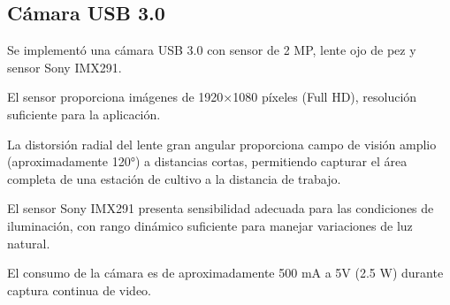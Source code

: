 \subsection{Cámara USB 3.0}

Se implementó una cámara USB 3.0 con sensor de 2 MP, lente ojo de pez y sensor Sony IMX291.

El sensor proporciona imágenes de 1920×1080 píxeles (Full HD), resolución suficiente para la aplicación.

La distorsión radial del lente gran angular proporciona campo de visión amplio (aproximadamente 120°) a distancias cortas, permitiendo capturar el área completa de una estación de cultivo a la distancia de trabajo.

El sensor Sony IMX291 presenta sensibilidad adecuada para las condiciones de iluminación, con rango dinámico suficiente para manejar variaciones de luz natural.

El consumo de la cámara es de aproximadamente 500 mA a 5V (2.5 W) durante captura continua de video.
